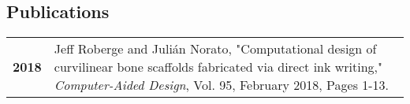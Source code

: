 \documentclass[darkhipster]{simplehipstercv}
\begin{document}
\begin{paracol}{2}
\begin{minipage}[t]{0.3\textwidth}
\section*{Publications}
\begin{tabular}{>{\footnotesize\bfseries}r >{\footnotesize}p{}}
    2018 & Jeff Roberge and Juli\'{a}n Norato, "Computational design of curvilinear bone scaffolds fabricated via direct ink writing," \emph{Computer-Aided Design}, Vol. 95, February 2018, Pages 1-13. \\
\end{tabular}
\bigskip
\end{minipage}


\end{paracol}
\end{document}
